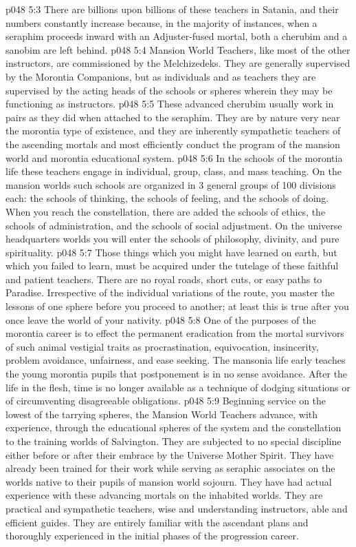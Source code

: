 \vs p048 5:3 There are billions upon billions of these teachers in Satania, and their numbers constantly increase because, in the majority of instances, when a seraphim proceeds inward with an Adjuster\hyp{}fused mortal, both a cherubim and a sanobim are left behind.
\vs p048 5:4 \pc Mansion World Teachers, like most of the other instructors, are commissioned by the Melchizedeks. They are generally supervised by the Morontia Companions, but as individuals and as teachers they are supervised by the acting heads of the schools or spheres wherein they may be functioning as instructors.
\vs p048 5:5 These advanced cherubim usually work in pairs as they did when attached to the seraphim. They are by nature very near the morontia type of existence, and they are inherently sympathetic teachers of the ascending mortals and most efficiently conduct the program of the mansion world and morontia educational system.
\vs p048 5:6 In the schools of the morontia life these teachers engage in individual, group, class, and mass teaching. On the mansion worlds such schools are organized in 3 general groups of 100 divisions each: the schools of thinking, the schools of feeling, and the schools of doing. When you reach the constellation, there are added the schools of ethics, the schools of administration, and the schools of social adjustment. On the universe headquarters worlds you will enter the schools of philosophy, divinity, and pure spirituality.
\vs p048 5:7 \pc Those things which you might have learned on earth, but which you failed to learn, must be acquired under the tutelage of these faithful and patient teachers. There are no royal roads, short cuts, or easy paths to Paradise. Irrespective of the individual variations of the route, you master the lessons of one sphere before you proceed to another; at least this is true after you once leave the world of your nativity.
\vs p048 5:8 One of the purposes of the morontia career is to effect the permanent eradication from the mortal survivors of such animal vestigial traits as procrastination, equivocation, insincerity, problem avoidance, unfairness, and ease seeking. The mansonia life early teaches the young morontia pupils that postponement is in no sense avoidance. After the life in the flesh, time is no longer available as a technique of dodging situations or of circumventing disagreeable obligations.
\vs p048 5:9 \pc Beginning service on the lowest of the tarrying spheres, the Mansion World Teachers advance, with experience, through the educational spheres of the system and the constellation to the training worlds of Salvington. They are subjected to no special discipline either before or after their embrace by the Universe Mother Spirit. They have already been trained for their work while serving as seraphic associates on the worlds native to their pupils of mansion world sojourn. They have had actual experience with these advancing mortals on the inhabited worlds. They are practical and sympathetic teachers, wise and understanding instructors, able and efficient guides. They are entirely familiar with the ascendant plans and thoroughly experienced in the initial phases of the progression career.
